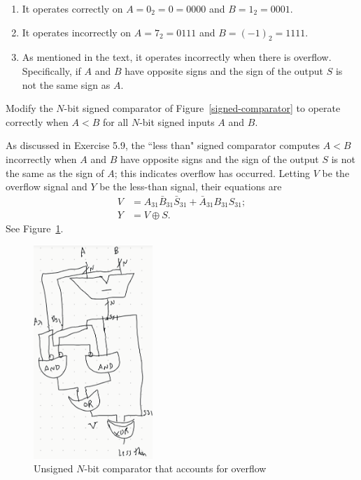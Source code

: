 \documentclass[12pt]{article}
\newenvironment{ex}[2][Exercise]{\begin{trivlist}
		\item[\hskip \labelsep {\bfseries #1}\hskip \labelsep {\bfseries #2.}]}{\end{trivlist}}
\newenvironment{sol}[1][Solution]{\begin{trivlist}
		\item[\hskip \labelsep {\bfseries #1:}]}{\end{trivlist}}
\begin{document}
\begin{sol}
	\begin{enumerate}[label=(\alph*)]
		\item It operates correctly on $A=0_2=0=0000$ and $B=1_2=0001$.
		\item It operates incorrectly on $A=7_2=0111$ and $B=(-1)_2=1111$.
		\item As mentioned in the text, it operates incorrectly when there
		is overflow. Specifically, if $A$ and $B$ have opposite signs and
		the sign of the output $S$ is not the same sign as $A$.
	\end{enumerate}
\end{sol}

\begin{ex}{5.10}
	Modify the $N$-bit signed comparator of Figure~\ref{signed-comparator} to operate
	correctly when $A<B$ for all $N$-bit signed inputs $A$ and $B$.
\end{ex}

\begin{sol}
	As discussed in Exercise 5.9, the ``less than" signed comparator computes $A<B$ incorrectly
	when $A$ and $B$ have opposite signs and the sign of the output $S$ is not the same as the
	sign of $A$; this indicates overflow has occurred. Letting $V$ be the overflow
	signal and $Y$ be the less-than signal, their equations are
	\begin{align*}
		V&=A_{31}\bar{B}_{31}\bar{S}_{31}+\bar{A}_{31}B_{31}S_{31};\\
		Y&=V\oplus S.
	\end{align*}
	See Figure~\ref{unsigned-comparator-overflow-accounted}.
	\begin{figure}
		\centering
		\includegraphics[width=0.4\textwidth]{unsigned-comparator-overflow-accounted}
		\caption{Unsigned $N$-bit comparator that accounts for overflow}
		\label{unsigned-comparator-overflow-accounted}
	\end{figure}
\end{sol}
\end{document}
